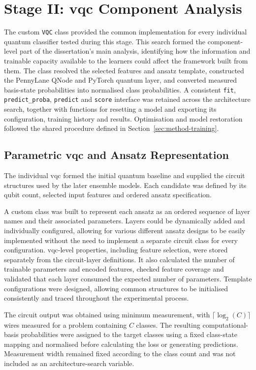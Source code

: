 \documentclass[]{UCD_CS_MSc_AAI_Report}
\begin{document}
\section{Stage II: \acs*{vqc} Component Analysis}
\label{sec:method-vqc-search}

The custom \texttt{VQC} class provided the common implementation for every individual quantum classifier tested during this stage. This search formed the component-level part of the dissertation's main analysis, identifying how the information and trainable capacity available to the learners could affect the framework built from them. The class resolved the selected features and ansatz template, constructed the PennyLane QNode and PyTorch quantum layer, and converted measured basis-state probabilities into normalised class probabilities. A consistent \texttt{fit}, \texttt{predict\_proba}, \texttt{predict} and \texttt{score} interface was retained across the architecture search, together with functions for resetting a model and exporting its configuration, training history and results. Optimisation and model restoration followed the shared procedure defined in Section~\ref{sec:method-training}.

\subsection{Parametric \acs*{vqc} and Ansatz Representation}

The individual \ac{vqc} formed the initial quantum baseline and supplied the circuit structures used by the later ensemble models. Each candidate was defined by its qubit count, selected input features and ordered ansatz specification.

A custom class was built to represent each ansatz as an ordered sequence of layer names and their associated parameters. Layers could be dynamically added and individually configured, allowing for various different ansatz designs to be easily implemented  without the need to implement a separate circuit class for every configuration. \ac{vqc}-level properties, including feature selection, were stored separately from the circuit-layer definitions. It also calculated the number of trainable parameters and encoded features, checked feature coverage and validated that each layer consumed the expected number of parameters. Template configurations were designed, allowing common structures to be initialised consistently and traced throughout the experimental process.

The circuit output was obtained using minimum measurement, with $\lceil\log_2(C)\rceil$ wires measured for a problem containing $C$ classes. The resulting computational-basis probabilities were assigned to the target classes using a fixed class-state mapping and normalised before calculating the loss or generating predictions. Measurement width remained fixed according to the class count and was not included as an architecture-search variable.
\end{document}
